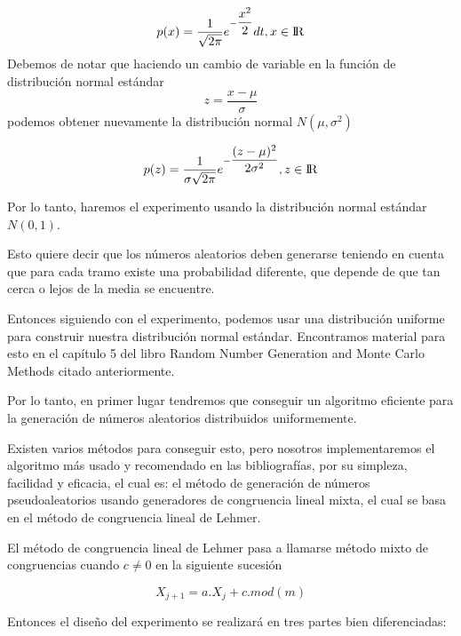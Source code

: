 \documentclass[conference,a4paper]{IEEEtran}
\begin{document}
$$p(x) = \dfrac {1}{\sqrt{2\pi}}
e^{-\dfrac{x^2}{2}} dt, x \in {\rm I\!R} $$
Debemos de notar que haciendo un cambio de variable en la funci\'on de distribuci\'on normal est\'andar $$z=\dfrac{x-\mu}{\sigma}$$ podemos obtener nuevamente la distribuci\'on normal $N(\mu,\sigma^2)$ 

$$p(z) = \dfrac {1}{\sigma\sqrt{2\pi}}
e^{-\dfrac{(z-\mu)^2}{2\sigma^2}} , z \in {\rm I\!R} $$

Por lo tanto, haremos el experimento usando la distribuci\'on normal est\'andar $N(0,1)$.

Esto quiere decir que los n\'umeros aleatorios deben generarse teniendo en cuenta que para cada tramo existe una probabilidad diferente, que depende de que tan cerca o lejos de la media se encuentre.

Entonces siguiendo con el experimento, podemos usar una distribuci\'on uniforme para construir nuestra distribuci\'on normal est\'andar. Encontramos material para esto en el cap\'itulo 5 del libro Random Number Generation and Monte Carlo Methods citado anteriormente.

Por lo tanto, en primer lugar tendremos que conseguir un algoritmo eficiente para la generaci\'on de n\'umeros aleatorios distribuidos uniformemente. 

Existen varios m\'etodos para conseguir esto, pero nosotros implementaremos el algoritmo m\'as usado y recomendado en las bibliograf\'ias, por su simpleza, facilidad y eficacia, el cual es: el m\'etodo de generaci\'on de n\'umeros pseudoaleatorios usando generadores de congruencia lineal mixta, el cual se basa en el m\'etodo de congruencia lineal de Lehmer.

El m\'etodo de congruencia lineal de Lehmer pasa a llamarse m\'etodo mixto de congruencias cuando $c \not= 0$ en la siguiente sucesi\'on

\begin{equation}
X_{j+1} = a.X_{j}+c.mod(m)
\end{equation}


Entonces el dise\~no del experimento se realizar\'a en tres partes bien diferenciadas:\\
\end{document}
